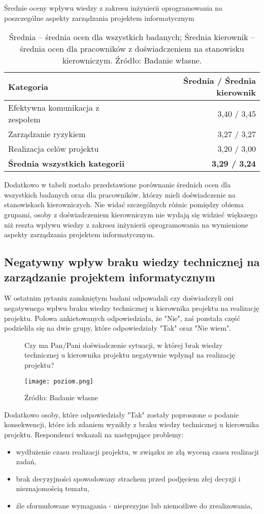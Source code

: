 \begin{table}[h]
\centering
\caption{Średnie oceny wpływu wiedzy z zakresu inżynierii oprogramowania na poszczególne aspekty zarządzania projektem informatycznym}
\begin{tabular}{p{8cm} r}
\toprule
\textbf{Kategoria} & \textbf{Średnia / Średnia kierownik} \\
\midrule
Efektywna komunikacja z zespołem & 3{,}40 / 3{,}45 \\
Zarządzanie ryzykiem & 3{,}27 / 3{,}27 \\
Realizacja celów projektu & 3{,}20 / 3{,}00 \\
\textbf{Średnia wszystkich kategorii} & \textbf{3{,}29 / 3{,}24} \\  
\bottomrule
\end{tabular}
\caption*{Średnia – średnia ocen dla wszystkich badanych; Średnia kierownik – średnia ocen dla pracowników z doświadczeniem na stanowisku kierowniczym. Źródło: Badanie własne.}
\end{table}

Dodatkowo w tabeli zostało przedstawione porównanie średnich ocen dla wszystkich badanych oraz dla pracowników, którzy mieli doświadczenie na stanowiskach kierowniczych. Nie widać szczególnych różnic pomiędzy obiema grupami, osoby z doświadczeniem kierowniczym nie wydają się widzieć większego niż reszta wpływu wiedzy z zakresu inżynierii oprogramowania na wymienione aspekty zarządzania projektem informatycznym. 

\subsection{Negatywny wpływ braku wiedzy technicznej na zarządzanie projektem informatycznym}
W ostatnim pytaniu zamkniętym badani odpowadali czy doświadczyli oni negatywnego wpłwu braku wiedzy technicznej u kierownika projektu na realizację projektu. Połowa ankietowanych odpowiedziała, że "Nie", zaś pozstała część podzieliła się na dwie grupy, które odpowiedziały "Tak" oraz "Nie wiem". 

\begin{figure}
  \caption{Czy ma Pan/Pani doświadczenie sytuacji, w której brak wiedzy technicznej u kierownika projektu negatywnie wpłynął na realizację projektu?}
  \centering
  \texttt{[image: poziom.png]}
  \caption*{Źródło: Badanie własne}
\end{figure}

Dodatkowo osoby, które odpowiedziały "Tak" zostały poproszone o podanie konsekwencji, które ich zdaniem wynikły z braku wiedzy technicznej u kierownika projektu. Respondenci wskazali na następujące problemy:
\begin{itemize}
  \item wydłużenie czasu realizacji projektu, w związku ze złą wyceną czasu realizacji zadań,
  \item brak decyzyjności spowodowany strachem przed podjęciem złej decyzji i nieznajomością tematu,
  \item źle sformułowane wymagania - nieprezyjne lub niemożliwe do zrealizowania,
\end{itemize}

